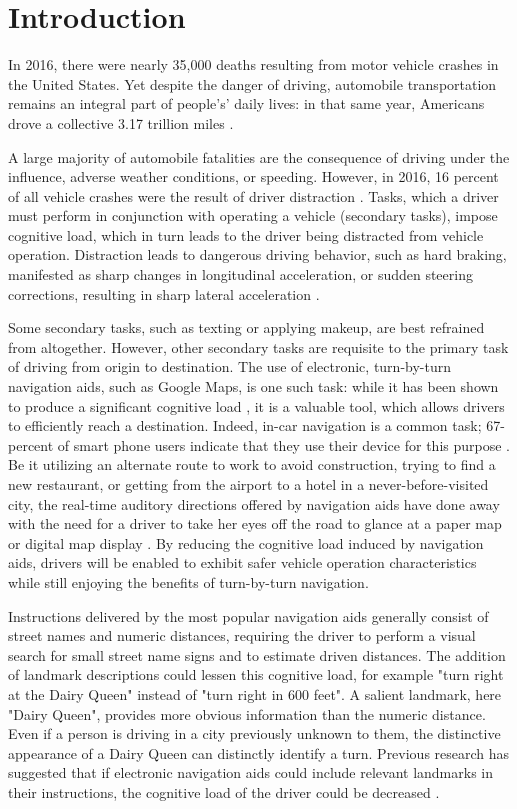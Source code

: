 \chapter{Introduction}\label{CH:introduction}
In 2016, there were nearly 35,000 deaths resulting from motor vehicle crashes \cite{crashes_48} in the United States. Yet despite the danger of driving, automobile transportation remains an integral part of people's’ daily lives: in that same year, Americans drove a collective 3.17 trillion miles \cite{crashes_48}.

A large majority of automobile fatalities are the consequence of driving under the influence, adverse weather conditions, or speeding. However, in 2016, 16 percent of all vehicle crashes were the result of driver distraction \cite{distracted_nhtsa_17}.  Tasks, which a driver must perform in conjunction with operating a vehicle (secondary tasks), impose cognitive load, which in turn leads to the driver being distracted from vehicle operation. Distraction leads to dangerous driving behavior, such as hard braking, manifested as sharp changes in longitudinal acceleration, or sudden steering corrections, resulting in sharp lateral acceleration \cite{harbluk_distraction_2002}. 

Some secondary tasks, such as texting or applying makeup, are best refrained from altogether. However, other secondary tasks are requisite to the primary task of driving from origin to destination. The use of electronic, turn-by-turn navigation aids, such as Google Maps, is one such task: while it has been shown to produce a significant cognitive load \cite{young_regan_distraction_2007}, it is a valuable tool, which allows drivers to efficiently reach a destination. Indeed, in-car navigation is a common task; 67-percent of smart phone users indicate that they use their device for this purpose \cite{pew_smartphone}. Be it utilizing an alternate route to work to avoid construction, trying to find a new restaurant, or getting from the airport to a hotel in a never-before-visited city, the real-time auditory directions offered by navigation aids have done away with the need for a driver to take her eyes off the road to glance at a paper map or digital map display \cite{walker1991vehicle}. By reducing the cognitive load induced by navigation aids, drivers will be enabled to exhibit safer vehicle operation characteristics while still enjoying the benefits of turn-by-turn navigation.

Instructions delivered by the most popular navigation aids generally consist of street names and numeric distances, requiring the driver to perform a visual search for small street name signs and to estimate driven distances. The addition of landmark descriptions could lessen this cognitive load, for example "turn right at the Dairy Queen" instead of "turn right in 600 feet". A salient landmark, here "Dairy Queen", provides more obvious information than the numeric distance. Even if a person is driving in a city previously unknown to them, the distinctive appearance of a Dairy Queen can distinctly identify a turn. Previous research has suggested that if electronic navigation aids could include relevant landmarks in their instructions, the cognitive load of the driver could be decreased \cite{burnett2000turn}.

